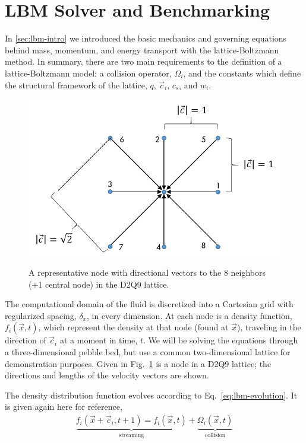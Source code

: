 \section{LBM Solver and Benchmarking}\label{sec:lbm-benchmark}

In \cref{sec:lbm-intro} we introduced the basic mechanics and governing equations behind mass, momentum, and energy transport with the lattice-Boltzmann method. In summary, there are two main requirements to the definition of a lattice-Boltzmann model: a collision operator, $\Omega_i$, and the constants which define the structural framework of the lattice, $q$, $\vec{c}_i$, $c_s$, and $w_i$.

\begin{figure}[t]
	\centering
	\caption{A representative node with directional vectors to the 8 neighbors (+1 central node) in the D2Q9 lattice.}
	\includegraphics[width=\singleimagewidth]{chapters/figures/lbm/d2q9-lattice.png}\label{fig:d2q9-lattice}
\end{figure}

The computational domain of the fluid is discretized into a Cartesian grid with regularized spacing, $\delta_x$, in every dimension. At each node is a density function, $f_i(\vec{x},t)$, which represent the density at that node (found at $\vec{x}$), traveling in the direction of $\vec{c}_i$ at a moment in time, $t$. We will be solving the equations through a three-dimensional pebble bed, but use a common two-dimensional lattice for demonstration purposes. Given in Fig.~\ref{fig:d2q9-lattice} is a node in a D2Q9 lattice; the directions and lengths of the velocity vectors are shown.

The density distribution function evolves according to Eq.~\ref{eq:lbm-evolution}. It is given again here for reference,
\begin{align}
	\underbrace{f_i(\vec{x}+\vec{c}_i, t + 1)  = f_i(\vec{x},t)}_\text{streaming}  + \underbrace{\Omega_i(\vec{x},t)}_\text{collision}
\end{align}

